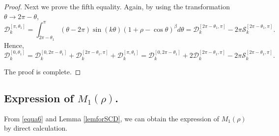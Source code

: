 \documentclass[11pt]{amsart}
\theoremstyle{remark}
\theoremstyle{definition}
\begin{document}
\begin{proof}
Next we prove the fifth equality. Again, by using the transformation $\theta \to 2\pi-\theta$,
\begin{equation*}
\mathcal{D}_{k}^{\left[\pi,\theta_{1}\right]}=\int_{2\pi-\theta_1}^{\pi}(\theta-2\pi)\sin(k\theta)\left(1+\rho-\cos\theta\right)^{\beta}d\theta=\mathcal{D}_{k}^{\left[2\pi-\theta_{1},\pi\right]}-2\pi\mathcal{S}_{k}^{\left[2\pi-\theta_{1},\pi\right]}.
\end{equation*}
Hence,
 \begin{equation*}
\mathcal{D}_{k}^{\left[0,\theta_{1}\right]}=\mathcal{D}_{k}^{\left[0,2\pi-\theta_1\right]}+\mathcal{D}_{k}^{\left[2\pi-\theta_1,\pi\right]}+\mathcal{D}_{k}^{\left[\pi,\theta_{1}\right]}=\mathcal{D}_{k}^{\left[0,2\pi-\theta_1\right]}+2\mathcal{D}_{k}^{\left[2\pi-\theta_{1},\pi\right]}-2\pi\mathcal{S}_{k}^{\left[2\pi-\theta_{1},\pi\right]}.
\end{equation*}


The proof is complete. \end{proof}








\subsection{Expression of $M_{1}(\rho)$.}

From \eqref{equa6} and  Lemma \ref{lemforSCD}, we can obtain the  expression of  $M_{1}(\rho)$ by direct calculation.
\end{document}
